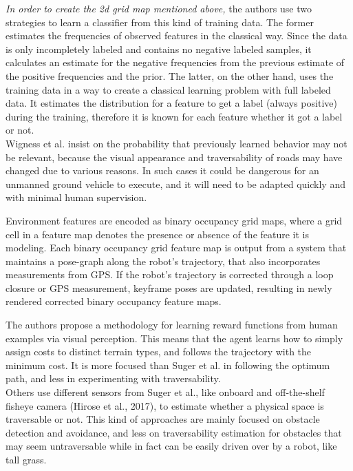 \documentclass[12pt,a4paper]{report}
\begin{document}
	\textit{In order to create the 2d grid map mentioned above,} the authors use two strategies to learn a classifier from this kind of 
	training data. The former estimates the frequencies of observed	features in the 
	classical way. Since the data is only incompletely labeled and contains no 
	negative labeled samples, it calculates an estimate for the negative 
	frequencies from the previous estimate of the positive frequencies and the prior. The 
	latter, on the other hand, uses the training data in a way to create a classical 
	learning problem with full labeled data. It estimates the distribution for a 
	feature to get a label (always positive) during the training, therefore it is 
	known for each feature whether it got a label or not.
	\\
	
	Wigness et al. \cite{Wigness} insist on the probability that previously learned 
	behavior may not be relevant, because the visual appearance and traversability 
	of roads may have changed due to various reasons. In such cases it could be 
	dangerous for an unmanned ground vehicle to execute, and it will need to be 
	adapted quickly and with minimal human supervision.
	
	Environment features are encoded as binary occupancy grid maps, where 
	a grid cell in a feature map denotes the presence or absence of the feature 
	it is modeling. Each binary occupancy grid feature map is output from a 
	system that maintains a pose-graph along the robot’s trajectory, that also 
	incorporates measurements from GPS. If the robot’s trajectory is corrected 
	through a loop closure or GPS measurement, keyframe poses are updated, 
	resulting in newly rendered corrected binary occupancy feature maps.
	
	The authors propose a methodology for learning reward functions from 
	human examples via visual perception. This means that the agent learns 
	how to simply assign costs to distinct terrain types, and follows the 
	trajectory with the minimum cost. It is more focused than Suger et al. in 
	following the optimum path, and less in experimenting with traversability.
	\\
	
	Others use different sensors from Suger et al., like onboard and off-the-shelf 
	fisheye camera \cite{Hirose} (Hirose et al., 2017), to estimate whether a physical space 
	is traversable or not. This kind of approaches are mainly focused on obstacle 
	detection and avoidance, and less on traversability estimation for obstacles 
	that may seem untraversable while in fact can be easily driven over by a 
	robot, like tall grass.
	\\
	
\end{document}
